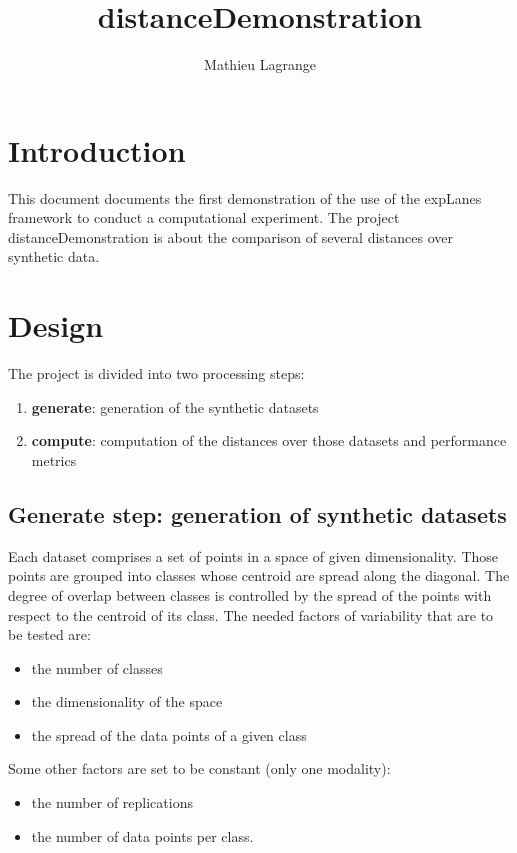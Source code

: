 \documentclass[12pt,a4paper,fleqn]{tufte-handout}
\title{distanceDemonstration}
\author{ Mathieu Lagrange }
\begin{document}
 
  
\maketitle 
  

\section{Introduction}

This document documents the first demonstration of the use of the expLanes framework to conduct a computational experiment. The project distanceDemonstration is about the comparison of several distances over synthetic data.



\section{Design}

 The project is divided into two processing steps:
\begin{enumerate}
\item \textbf{generate}: generation of the synthetic datasets
\item \textbf{compute}: computation of the distances over those datasets and performance metrics
\end{enumerate}

\subsection{\textbf{Generate step}: generation of synthetic datasets}

Each dataset comprises a set of points in a space of given dimensionality. Those points are grouped into classes whose centroid are spread along the diagonal. The degree of overlap between classes is controlled by the spread of the points with respect to the centroid of its class. The needed factors of variability that are to be tested are:
\begin{itemize}
\item the number of classes
\item the dimensionality of the space
\item the spread of the data points of a given class
\end{itemize}
Some other factors are set to be constant (only one modality):
\begin{itemize}
\item the number of replications
\item the number of data points per class.
\end{itemize}
\end{document}
